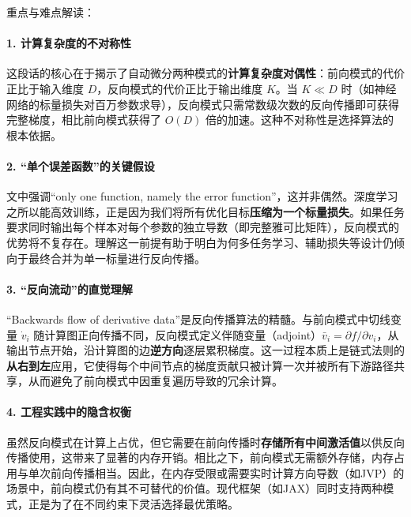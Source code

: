 \documentclass{article}
\begin{document}
{\color{blue}
重点与难点解读：

\paragraph{1. 计算复杂度的不对称性}
这段话的核心在于揭示了自动微分两种模式的\textbf{计算复杂度对偶性}：前向模式的代价正比于输入维度 $D$，反向模式的代价正比于输出维度 $K$。当 $K \ll D$ 时（如神经网络的标量损失对百万参数求导），反向模式只需常数级次数的反向传播即可获得完整梯度，相比前向模式获得了 $O(D)$ 倍的加速。这种不对称性是选择算法的根本依据。

\paragraph{2. ``单个误差函数''的关键假设}
文中强调``only one function, namely the error function''，这并非偶然。深度学习之所以能高效训练，正是因为我们将所有优化目标\textbf{压缩为一个标量损失}。如果任务要求同时输出每个样本对每个参数的独立导数（即完整雅可比矩阵），反向模式的优势将不复存在。理解这一前提有助于明白为何多任务学习、辅助损失等设计仍倾向于最终合并为单一标量进行反向传播。

\paragraph{3. ``反向流动''的直觉理解}
``Backwards flow of derivative data''是反向传播算法的精髓。与前向模式中切线变量 $\dot{v}_i$ 随计算图正向传播不同，反向模式定义伴随变量（adjoint）$\bar{v}_i = \partial f / \partial v_i$，从输出节点开始，沿计算图的边\textbf{逆方向}逐层累积梯度。这一过程本质上是链式法则的\textbf{从右到左}应用，它使得每个中间节点的梯度贡献只被计算一次并被所有下游路径共享，从而避免了前向模式中因重复遍历导致的冗余计算。

\paragraph{4. 工程实践中的隐含权衡}
虽然反向模式在计算上占优，但它需要在前向传播时\textbf{存储所有中间激活值}以供反向传播使用，这带来了显著的内存开销。相比之下，前向模式无需额外存储，内存占用与单次前向传播相当。因此，在内存受限或需要实时计算方向导数（如JVP）的场景中，前向模式仍有其不可替代的价值。现代框架（如JAX）同时支持两种模式，正是为了在不同约束下灵活选择最优策略。
}
\end{document}
